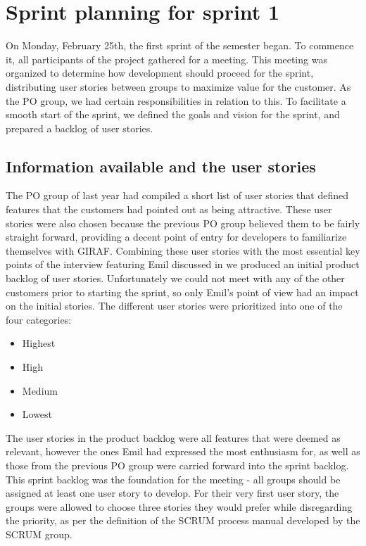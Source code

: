 \section{Sprint planning for sprint 1}
On Monday, February 25th, the first sprint of the semester began. 
To commence it, all participants of the project gathered for a meeting.
This meeting was organized to determine how development should proceed for the sprint, distributing user stories between groups to maximize value for the customer.
As the PO group, we had certain responsibilities in relation to this.
To facilitate a smooth start of the sprint, we defined the goals and vision for the sprint, and prepared a backlog of user stories.

\subsection{Information available and the user stories}
The PO group of last year had compiled a short list of user stories that defined features that the customers had pointed out as being attractive.
These user stories were also chosen because the previous PO group believed them to be fairly straight forward, providing a decent point of entry for developers to familiarize themselves with GIRAF.
Combining these user stories with the most essential key points of the interview featuring Emil discussed in  we produced an initial product backlog of user stories.
Unfortunately we could not meet with any of the other customers prior to starting the sprint, so only Emil's point of view had an impact on the initial stories.
The different user stories were prioritized into one of the four categories:
\begin{itemize}
    \item Highest
    \item High
    \item Medium
    \item Lowest
\end{itemize}
The user stories in the product backlog were all features that were deemed as relevant, however the ones Emil had expressed the most enthusiasm for, as well as those from the previous PO group were carried forward into the sprint backlog.
This sprint backlog was the foundation for the meeting - all groups should be assigned at least one user story to develop.
For their very first user story, the groups were allowed to choose three stories they would prefer while disregarding the priority, as per the definition of the SCRUM process manual developed by the SCRUM group.

